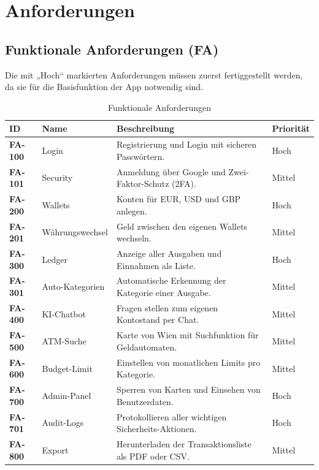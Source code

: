 \documentclass[11pt,a4paper]{article}
\begin{document}
\newpage

\section{Anforderungen}

\subsection{Funktionale Anforderungen (FA)}

\begin{tcolorbox}[colback=bglight, colframe=accentblue, arc=4pt, title=\textbf{\color{white}Wichtiger Hinweis}]
Die mit „Hoch“ markierten Anforderungen müssen zuerst fertiggestellt werden, da sie für die Basisfunktion der App notwendig sind.
\end{tcolorbox}

\begin{table}[h]
\centering
\small
\begin{tabular}{llp{7.5cm}l}
\toprule
\textbf{\color{accentblue}ID} & \textbf{\color{accentblue}Name} & \textbf{\color{accentblue}Beschreibung} & \textbf{\color{accentblue}Priorität} \\
\midrule
\textbf{FA-100} & Login & Registrierung und Login mit sicheren Passwörtern. & Hoch \\
\textbf{FA-101} & Security & Anmeldung über Google und Zwei-Faktor-Schutz (2FA). & Mittel \\
\textbf{FA-200} & Wallets & Konten für EUR, USD und GBP anlegen. & Hoch \\
\textbf{FA-201} & Währungswechsel & Geld zwischen den eigenen Wallets wechseln. & Mittel \\
\textbf{FA-300} & Ledger & Anzeige aller Ausgaben und Einnahmen als Liste. & Hoch \\
\textbf{FA-301} & Auto-Kategorien & Automatische Erkennung der Kategorie einer Ausgabe. & Mittel \\
\textbf{FA-400} & KI-Chatbot & Fragen stellen zum eigenen Kontostand per Chat. & Mittel \\
\textbf{FA-500} & ATM-Suche & Karte von Wien mit Suchfunktion für Geldautomaten. & Mittel \\
\textbf{FA-600} & Budget-Limit & Einstellen von monatlichen Limits pro Kategorie. & Mittel \\
\textbf{FA-700} & Admin-Panel & Sperren von Karten und Einsehen von Benutzerdaten. & Hoch \\
\textbf{FA-701} & Audit-Logs & Protokollieren aller wichtigen Sicherheits-Aktionen. & Hoch \\
\textbf{FA-800} & Export & Herunterladen der Transaktionsliste als PDF oder CSV. & Mittel \\
\bottomrule
\end{tabular}
\caption{Funktionale Anforderungen}
\end{table}
\end{document}
